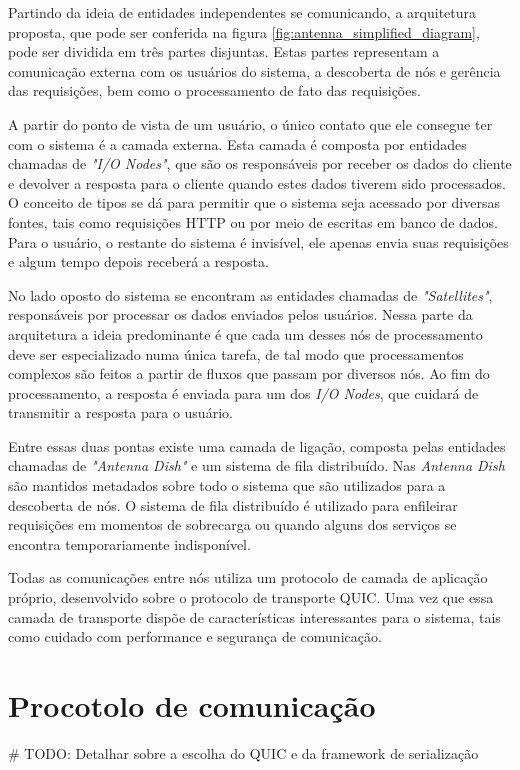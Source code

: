     Partindo da ideia de entidades independentes se comunicando, a arquitetura proposta, que pode ser conferida na figura \ref{fig:antenna_simplified_diagram}, pode ser dividida em três partes disjuntas. Estas partes representam a comunicação externa com os usuários do sistema, a descoberta de nós e gerência das requisições, bem como o processamento de fato das requisições.
    
    A partir do ponto de vista de um usuário, o único contato que ele consegue ter com o sistema é a camada externa. Esta camada é composta por entidades chamadas de \textit{"I/O Nodes"}, que são os responsáveis por receber os dados do cliente e devolver a resposta para o cliente quando estes dados tiverem sido processados. O conceito de tipos se dá para permitir que o sistema seja acessado por diversas fontes, tais como requisições HTTP ou por meio de escritas em banco de dados. Para o usuário, o restante do sistema é invisível, ele apenas envia suas requisições e algum tempo depois receberá a resposta.
    
    No lado oposto do sistema se encontram as entidades chamadas de \textit{"Satellites"}, responsáveis por processar os dados enviados pelos usuários. Nessa parte da arquitetura a ideia predominante é que cada um desses nós de processamento deve ser especializado numa única tarefa, de tal modo que processamentos complexos são feitos a partir de fluxos que passam por diversos nós. Ao fim do processamento, a resposta é enviada para um dos \textit{I/O Nodes}, que cuidará de transmitir a resposta para o usuário.
    
    Entre essas duas pontas existe uma camada de ligação, composta pelas entidades chamadas de \textit{"Antenna Dish"} e um sistema de fila distribuído. Nas \textit{Antenna Dish} são mantidos metadados sobre todo o sistema que são utilizados para a descoberta de nós. O sistema de fila distribuído é utilizado para enfileirar requisições em momentos de sobrecarga ou quando alguns dos serviços se encontra temporariamente indisponível.
    
    Todas as comunicações entre nós utiliza um protocolo de camada de aplicação próprio, desenvolvido sobre o protocolo de transporte QUIC. Uma vez que essa camada de transporte dispõe de características interessantes para o sistema, tais como cuidado com performance e segurança de comunicação. 

\section{Procotolo de comunicação}
    {\color{red} \# TODO: Detalhar sobre a escolha do QUIC e da framework de serialização}

